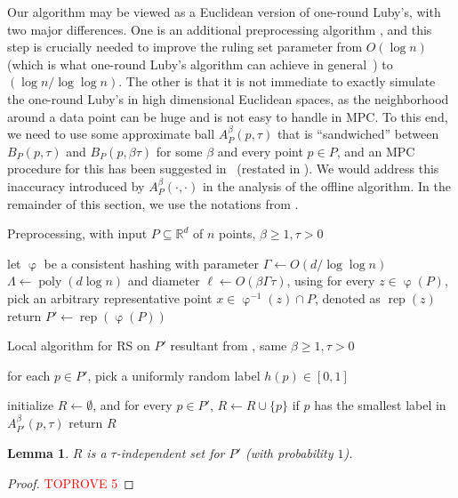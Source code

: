 \documentclass[11pt,letterpaper]{article}
\theoremstyle{plain}
\newtheorem{lemma}[theorem]{Lemma}
\theoremstyle{definition}
\theoremstyle{remark}
\DeclareMathOperator{\poly}{poly}
\DeclareMathOperator*{\hash}{\varphi}
\DeclareMathOperator*{\rep}{rep}
\begin{document}
Our algorithm may be viewed as a Euclidean version of one-round Luby's,
with two major differences. One is an additional preprocessing algorithm ,
and this step is crucially needed to improve the ruling set parameter from $O(\log n)$ (which is what one-round Luby's algorithm can achieve in general~\cite{dist_graph_book}) to $(\log n / \log\log n)$.
The other is that it is not immediate to exactly simulate the one-round Luby's in high dimensional Euclidean spaces,
as the neighborhood around a data point can be huge and is not easy to handle in MPC.
To this end, we need to use some approximate ball $A^\beta_P(p, \tau)$ that is ``sandwiched'' between $B_P(p, \tau)$ and $B
_{P}(p, \beta \tau)$ for some $\beta$ and every point $p \in P$,
and an MPC procedure for this has been suggested in~\cite{CGJKV24} (restated in ).
We would address this inaccuracy introduced by $A^\beta_P(\cdot, \cdot)$ in the analysis of the offline algorithm.
In the remainder of this section, we use the notations from .




\begin{algorithm}
    \begin{algorithmic}[1]
        \caption{Preprocessing, with input $P \subseteq \mathbb{R}^d$ of $n$ points, $\beta \geq 1, \tau > 0$}
        \label{alg:rs_hash}
\State let $\hash$  be a consistent hashing with parameter $\Gamma \gets O(d / \log\log n)$
        $\Lambda \gets \poly(d\log n)$ and diameter $\ell \gets O(\beta\Gamma \tau)$, using 
\State for every $z \in \hash(P)$, pick an arbitrary representative point $x \in \hash^{-1}(z) \cap P$,
        denoted as $\rep(z)$
        \State return $P' \gets \rep(\hash(P))$
\end{algorithmic}
\end{algorithm}



\begin{algorithm}
    \caption{Local algorithm for RS on $P'$ resultant from , same $\beta \geq 1, \tau > 0$}
    \label{alg:local_kcenter}
    \begin{algorithmic}[1]
\State for each $p\in P'$, pick a uniformly random label $h(p)\in [0,1]$
        
        \State initialize $R\gets \emptyset$, and for every $p \in P'$, $R \gets R \cup \{p\}$ if $p$ has the smallest label in $A_{P'}^{\beta}(p, \tau)$ 
            \label{line:rule}
        \State return $R$
    \end{algorithmic}
\end{algorithm}
    \begin{lemma}
        \label{lemma:C_independent_set}
$R$ is a $\tau$-independent set for $P'$ (with probability $1$).  
    \end{lemma}
\begin{proof}\textcolor{red}{TOPROVE 5}\end{proof}
\end{document}
